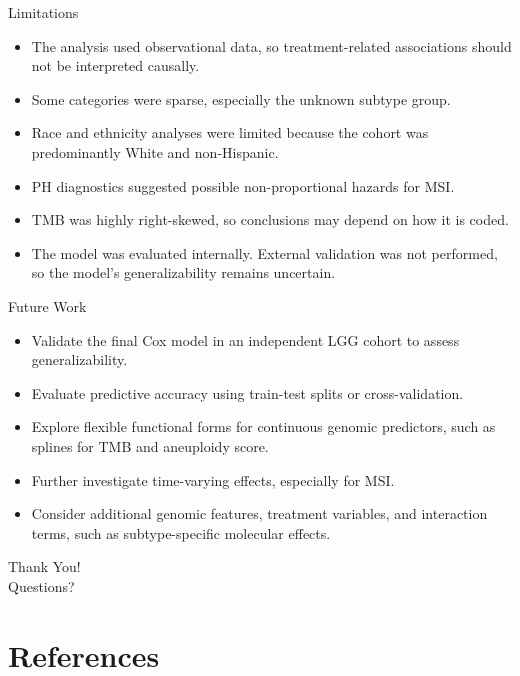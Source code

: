 \documentclass{beamer}
\begin{document}
\begin{frame}{Limitations}
\begin{itemize}
    \item The analysis used observational data, so treatment-related associations should not be interpreted causally.
    \item Some categories were sparse, especially the unknown subtype group.
    \item Race and ethnicity analyses were limited because the cohort was predominantly White and non-Hispanic.
    \item PH diagnostics suggested possible non-proportional hazards for MSI.
    \item TMB was highly right-skewed, so conclusions may depend on how it is coded.
    \item The model was evaluated internally. External validation was not performed, so the model’s generalizability remains uncertain.
\end{itemize}
\end{frame}

\begin{frame}{Future Work}
\begin{itemize}
    \item Validate the final Cox model in an independent LGG cohort to assess generalizability.
    \item Evaluate predictive accuracy using train-test splits or cross-validation.
    \item Explore flexible functional forms for continuous genomic predictors, such as splines for TMB and aneuploidy score.
    \item Further investigate time-varying effects, especially for MSI.
    \item Consider additional genomic features, treatment variables, and interaction terms, such as subtype-specific molecular effects.
\end{itemize}
\end{frame}

\begin{frame}
\centering
\Large  Thank You! \\
\normalsize Questions?
\end{frame}

\section{References}
\end{document}
